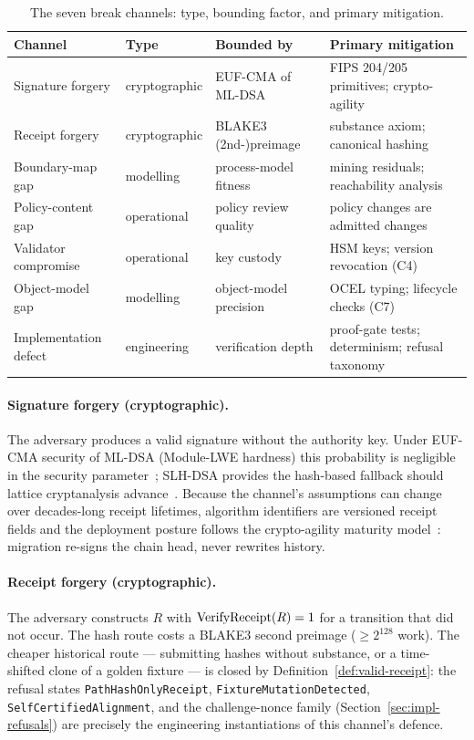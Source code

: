 \begin{table}[t]
\centering
\caption{The seven break channels: type, bounding factor, and primary mitigation.}
\label{tab:channels}
\begin{tabularx}{\textwidth}{lllX}
\toprule
\textbf{Channel} & \textbf{Type} & \textbf{Bounded by} & \textbf{Primary mitigation}\\
\midrule
Signature forgery     & cryptographic   & EUF-CMA of ML-DSA      & FIPS 204/205 primitives; crypto-agility\\
Receipt forgery       & cryptographic   & BLAKE3 (2nd-)preimage  & substance axiom; canonical hashing\\
Boundary-map gap      & modelling       & process-model fitness   & mining residuals; reachability analysis\\
Policy-content gap    & operational     & policy review quality   & policy changes are admitted changes\\
Validator compromise  & operational     & key custody             & HSM keys; version revocation (C4)\\
Object-model gap      & modelling       & object-model precision  & OCEL typing; lifecycle checks (C7)\\
Implementation defect & engineering     & verification depth      & proof-gate tests; determinism; refusal taxonomy\\
\bottomrule
\end{tabularx}
\end{table}

\paragraph{Signature forgery (cryptographic).}
The adversary produces a valid signature without the authority key. Under
EUF-CMA security of ML-DSA (Module-LWE hardness) this probability is negligible
in the security parameter~\cite{nist_fips_204_2024,bernstein_lange_pqc_2017};
SLH-DSA provides the hash-based fallback should lattice cryptanalysis
advance~\cite{nist_fips_205_2024}. Because the channel's assumptions can change
over decades-long receipt lifetimes, algorithm identifiers are versioned receipt
fields and the deployment posture follows the crypto-agility maturity
model~\cite{crypto_agility_maturity_2022}: migration re-signs the chain head,
never rewrites history.

\paragraph{Receipt forgery (cryptographic).}
The adversary constructs $R$ with $\operatorname{VerifyReceipt}(R) = 1$ for a transition that
did not occur. The hash route costs a BLAKE3 second preimage ($\geq 2^{128}$
work). The cheaper historical route --- submitting hashes without substance, or
a time-shifted clone of a golden fixture --- is closed by
Definition~\ref{def:valid-receipt}: the refusal states
\texttt{PathHashOnlyReceipt}, \texttt{FixtureMutationDetected},
\texttt{SelfCertifiedAlignment}, and the challenge-nonce family
(Section~\ref{sec:impl-refusals}) are precisely the engineering instantiations
of this channel's defence.

